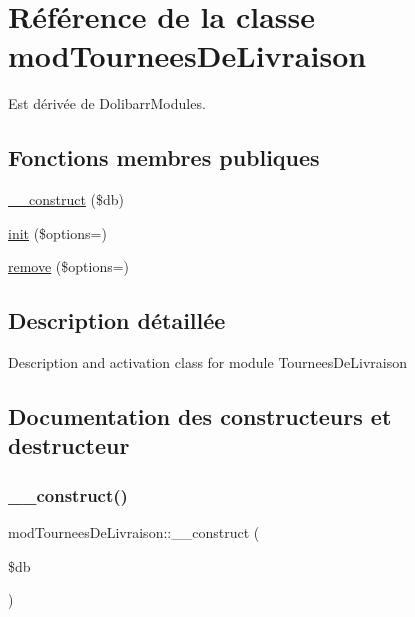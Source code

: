 \hypertarget{classmodTourneesDeLivraison}{}\section{Référence de la classe mod\+Tournees\+De\+Livraison}
\label{classmodTourneesDeLivraison}


Est dérivée de Dolibarr\+Modules.

\subsection*{Fonctions membres publiques}
\begin{DoxyCompactItemize}
\item 
\hyperlink{classmodTourneesDeLivraison_a4a6358823b820e72cba1351abb8a0df4}{\+\_\+\+\_\+construct} (\$db)
\item 
\hyperlink{classmodTourneesDeLivraison_ac491842ccad1b2aed3f63116b2cfd297}{init} (\$options=\textquotesingle{}\textquotesingle{})
\item 
\hyperlink{classmodTourneesDeLivraison_aad184c60cb2e396ffd18c07aefaa24d8}{remove} (\$options=\textquotesingle{}\textquotesingle{})
\end{DoxyCompactItemize}


\subsection{Description détaillée}
Description and activation class for module Tournees\+De\+Livraison 

\subsection{Documentation des constructeurs et destructeur}
\mbox{\label{classmodTourneesDeLivraison_a4a6358823b820e72cba1351abb8a0df4}} 
\subsubsection{\texorpdfstring{\+\_\+\+\_\+construct()}{\_\_construct()}}
{\footnotesize\ttfamily mod\+Tournees\+De\+Livraison\+::\+\_\+\+\_\+construct (\begin{DoxyParamCaption}\item[{}]{\$db }\end{DoxyParamCaption})}

